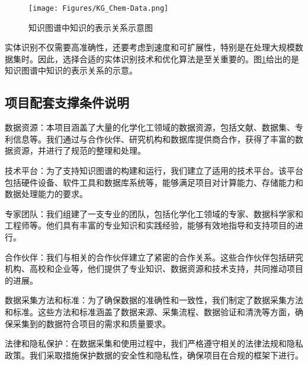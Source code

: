 \begin{figure}[h!]
\centering
\texttt{[image: Figures/KG\_Chem-Data.png]}
\caption{\small\textrm{知识图谱中知识的表示关系示意图}}%
\label{Fig:KG-Chem_Data}
\end{figure}
实体识别不仅需要高准确性，还要考虑到速度和可扩展性，特别是在处理大规模数据集时。因此，选择合适的实体识别技术和优化算法是至关重要的。图\ref{Fig:KG-Chem_Data}给出的是知识图谱中知识的表示关系的示意。

\subsection{项目配套支撑条件说明} 
数据资源：本项目涵盖了大量的化学化工领域的数据资源，包括文献、数据集、专利信息等。我们通过与合作伙伴、研究机构和数据库提供商合作，获得了丰富的数据资源，并进行了规范的整理和处理。

技术平台：为了支持知识图谱的构建和运行，我们建立了适用的技术平台。该平台包括硬件设备、软件工具和数据库系统等，能够满足项目对计算能力、存储能力和数据处理能力的要求。

专家团队：我们组建了一支专业的团队，包括化学化工领域的专家、数据科学家和工程师等。他们具有丰富的专业知识和实践经验，能够有效地指导和支持项目的进行。

合作伙伴：我们与相关的合作伙伴建立了紧密的合作关系。这些合作伙伴包括研究机构、高校和企业等，他们提供了专业知识、数据资源和技术支持，共同推动项目的进展。

数据采集方法和标准：为了确保数据的准确性和一致性，我们制定了数据采集方法和标准。这些方法和标准涵盖了数据来源、采集流程、数据验证和清洗等方面，确保采集到的数据符合项目的需求和质量要求。

法律和隐私保护：在数据采集和使用过程中，我们严格遵守相关的法律法规和隐私政策。我们采取措施保护数据的安全性和隐私性，确保项目在合规的框架下进行。
